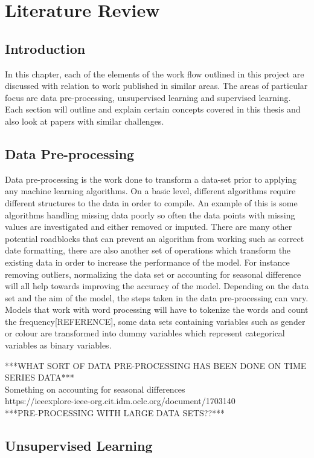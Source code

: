 \chapter{Literature Review}
\section{Introduction}
In this chapter, each of the elements of the work flow outlined in this project are discussed with relation to work published in similar areas. The areas of particular focus are data pre-processing, unsupervised learning and supervised learning. Each section will outline and explain certain concepts covered in this thesis and also look at papers with similar challenges.
\section{Data Pre-processing}
Data pre-processing is the work done to transform a data-set prior to applying any machine learning algorithms. On a basic level, different algorithms require different structures to the data in order to compile. An example of this is some algorithms handling missing data poorly so often the data points with missing values are investigated and either removed or imputed. There are many other potential roadblocks that can prevent an algorithm from working such as correct date formatting, there are also another set of operations which transform the existing data in order to increase the performance of the model. For instance removing outliers, normalizing the data set or accounting for seasonal difference will all help towards improving the accuracy of the model. Depending on the data set and the aim of the model, the steps taken in the data pre-processing can vary. Models that work with word processing will have to tokenize the words and count the frequency[REFERENCE], some data sets containing variables such as gender or colour are transformed into dummy variables which represent categorical variables as binary variables.

***WHAT SORT OF DATA PRE-PROCESSING HAS BEEN DONE ON TIME SERIES DATA***\\
Something on accounting for seasonal differences 
\\
https://ieeexplore-ieee-org.cit.idm.oclc.org/document/1703140
\\

***PRE-PROCESSING WITH LARGE DATA SETS??***

\section{Unsupervised Learning}
